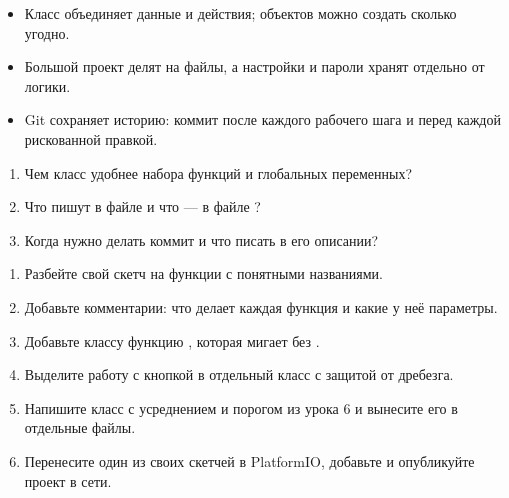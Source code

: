 \begin{summary}
\begin{itemize}[leftmargin=*]
  \item Класс объединяет данные и действия; объектов можно создать сколько угодно.
  \item Большой проект делят на файлы, а настройки и пароли хранят отдельно от логики.
  \item Git сохраняет историю: коммит после каждого рабочего шага и перед каждой рискованной правкой.
\end{itemize}
\end{summary}

\begin{selfcheck}
\begin{enumerate}
  \item Чем класс удобнее набора функций и глобальных переменных?
  \item Что пишут в файле  и что --- в файле ?
  \item Когда нужно делать коммит и что писать в его описании?
\end{enumerate}
\end{selfcheck}

\begin{tasks}
\begin{enumerate}
\item {} Разбейте свой скетч на функции с понятными названиями.
\item {} Добавьте комментарии: что делает каждая функция и какие у неё параметры.
\item {} Добавьте классу  функцию , которая мигает без .
\item {} Выделите работу с кнопкой в отдельный класс с защитой от дребезга.
\item {} Напишите класс  с усреднением и порогом из урока 6 и вынесите его в отдельные файлы.
\item {} Перенесите один из своих скетчей в PlatformIO, добавьте  и опубликуйте проект в сети.
\end{enumerate}
\end{tasks}
